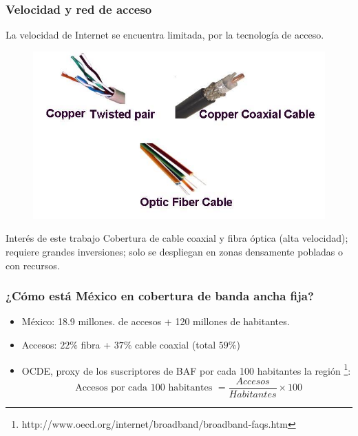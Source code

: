 \documentclass[xcolor=dvipsnames, compress]{beamer}
\begin{document}
\begin{frame}
\frametitle{Velocidad y red de acceso}
La velocidad de Internet se encuentra limitada, por la tecnología de acceso. 

\begin{figure}
	\includegraphics[scale=0.2]{images/access_technology.jpg}
\end{figure}

\begin{block}{Interés de este trabajo}
	Cobertura de cable coaxial y fibra óptica (alta velocidad); requiere grandes inversiones; solo se despliegan en zonas densamente pobladas o con recursos.
\end{block}

\end{frame}

\begin{frame}
\frametitle{¿Cómo está México en cobertura de banda ancha fija?}

\begin{itemize}
	
\item México: 18.9 millones. de accesos + 120 millones de habitantes.
\item Accesos: $22\%$ fibra + $37\%$ cable coaxial (total $59\%$)

\item OCDE, proxy de los suscriptores de BAF por cada 100 habitantes la región \footnote{http://www.oecd.org/internet/broadband/broadband-faqs.htm}:
\begin{equation}\label{pen_habitantes}
\mbox{ Accesos por cada 100 habitantes } = \frac{Accesos }{Habitantes} \times 100 
\end{equation}
\end{itemize}

\end{frame}
\end{document}
